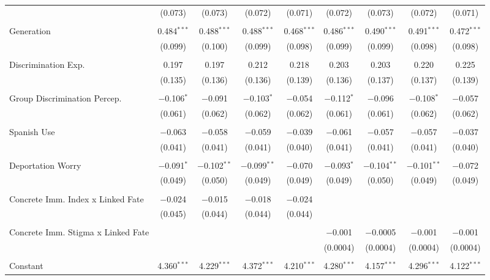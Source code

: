 \begin{table}[!htbp]
\begin{tabular}{@{\extracolsep{5pt}}lcccccccc}
  & (0.073) & (0.073) & (0.072) & (0.071) & (0.072) & (0.073) & (0.072) & (0.071) \\ 
  & & & & & & & & \\ 
 Generation & 0.484$^{***}$ & 0.488$^{***}$ & 0.488$^{***}$ & 0.468$^{***}$ & 0.486$^{***}$ & 0.490$^{***}$ & 0.491$^{***}$ & 0.472$^{***}$ \\ 
  & (0.099) & (0.100) & (0.099) & (0.098) & (0.099) & (0.099) & (0.098) & (0.098) \\ 
  & & & & & & & & \\ 
 Discrimination Exp. & 0.197 & 0.197 & 0.212 & 0.218 & 0.203 & 0.203 & 0.220 & 0.225 \\ 
  & (0.135) & (0.136) & (0.136) & (0.139) & (0.136) & (0.137) & (0.137) & (0.139) \\ 
  & & & & & & & & \\ 
 Group Discrimination Percep. & $-$0.106$^{*}$ & $-$0.091 & $-$0.103$^{*}$ & $-$0.054 & $-$0.112$^{*}$ & $-$0.096 & $-$0.108$^{*}$ & $-$0.057 \\ 
  & (0.061) & (0.062) & (0.062) & (0.062) & (0.061) & (0.061) & (0.062) & (0.062) \\ 
  & & & & & & & & \\ 
 Spanish Use & $-$0.063 & $-$0.058 & $-$0.059 & $-$0.039 & $-$0.061 & $-$0.057 & $-$0.057 & $-$0.037 \\ 
  & (0.041) & (0.041) & (0.041) & (0.040) & (0.041) & (0.041) & (0.041) & (0.040) \\ 
  & & & & & & & & \\ 
 Deportation Worry & $-$0.091$^{*}$ & $-$0.102$^{**}$ & $-$0.099$^{**}$ & $-$0.070 & $-$0.093$^{*}$ & $-$0.104$^{**}$ & $-$0.101$^{**}$ & $-$0.072 \\ 
  & (0.049) & (0.050) & (0.049) & (0.049) & (0.049) & (0.050) & (0.049) & (0.049) \\ 
  & & & & & & & & \\ 
 Concrete Imm. Index x Linked Fate & $-$0.024 & $-$0.015 & $-$0.018 & $-$0.024 &  &  &  &  \\ 
  & (0.045) & (0.044) & (0.044) & (0.044) &  &  &  &  \\ 
  & & & & & & & & \\ 
 Concrete Imm. Stigma x Linked Fate &  &  &  &  & $-$0.001 & $-$0.0005 & $-$0.001 & $-$0.001 \\ 
  &  &  &  &  & (0.0004) & (0.0004) & (0.0004) & (0.0004) \\ 
  & & & & & & & & \\ 
 Constant & 4.360$^{***}$ & 4.229$^{***}$ & 4.372$^{***}$ & 4.210$^{***}$ & 4.280$^{***}$ & 4.157$^{***}$ & 4.296$^{***}$ & 4.122$^{***}$ \\ 

\end{tabular}
\end{table}
